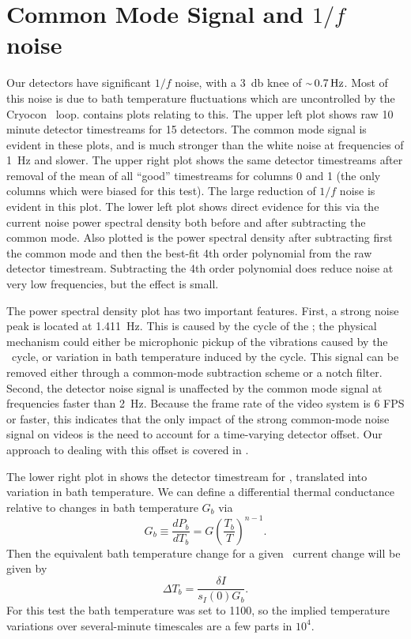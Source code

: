 \section{Common Mode Signal and $1/f$ noise} \label{sec:ch6-common}


Our detectors have significant $1/f$ noise, with a \SI{3}{\decibel} knee of $\abt{\SI{0.7}{\hertz}}$.
Most of this noise is due to bath temperature fluctuations which are uncontrolled by the Cryocon \PID\ loop.
 contains plots relating to this.
The upper left plot shows raw 10 minute detector timestreams for 15 detectors.
The common mode signal is evident in these plots, and is much stronger than the white noise at frequencies of \SI{1}{\Hz} and slower.
The upper right plot shows the same detector timestreams after removal of the mean of all ``good'' timestreams for columns 0 and 1 (the only columns which were biased for this test).
The large reduction of $1/f$ noise is evident in this plot.
The lower left plot shows direct evidence for this via the current noise power spectral density both before and after subtracting the common mode.
Also plotted is the power spectral density after subtracting first the common mode and then the best-fit 4th order polynomial from the raw detector timestream.
Subtracting the 4th order polynomial does reduce noise at very low frequencies, but the effect is small.

The power spectral density plot has two important features.
First, a strong noise peak is located at \SI{1.411}{\Hz}.
This is caused by the  cycle of the \PTC; the physical mechanism could either be microphonic pickup of the vibrations caused by the \PTC\ cycle, or variation in bath temperature induced by the cycle.
This signal can be removed either through a common-mode subtraction scheme or a notch filter.
Second, the detector noise signal is unaffected by the common mode signal at frequencies faster than \SI{2}{\Hz}.
Because the frame rate of the video system is 6 FPS or faster, this indicates that the only impact of the strong common-mode noise signal on videos is the need to account for a time-varying detector offset.
Our approach to dealing with this offset is covered in .

The lower right plot in  shows the detector timestream for , translated into variation in bath temperature.
We can define a differential thermal conductance relative to changes in bath temperature $G_b$ via
\begin{equation}
  G_b \equiv \frac{dP_b}{d T_b} = G \left( \frac{T_b}{T} \right)^{n-1}.
\end{equation}
Then the equivalent bath temperature change for a given \TES\ current change will be given by
\begin{equation}
  \Delta T_b = \frac{\delta I}{s_I(0) G_b}.
\end{equation}
For this test the bath temperature was set to \SI{1100}{\mK}, so the implied temperature variations over several-minute timescales are a few parts in $10^{4}$.

